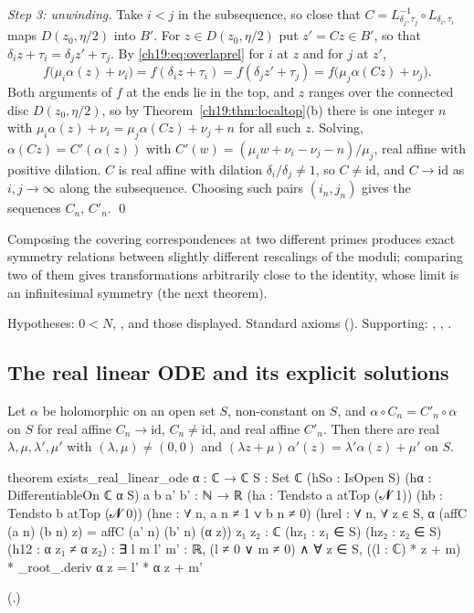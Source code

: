 \emph{Step 3: unwinding.}  Take $i<j$ in the subsequence, so close that $C=L_{\delta_j,\tau_j}^{-1}\circ L_{\delta_i,\tau_i}$ maps
$D(z_0,\eta/2)$ into $B'$.  For $z\in D(z_0,\eta/2)$ put $z'=Cz\in B'$, so that $\delta_iz+\tau_i=\delta_jz'+\tau_j$.  By
\eqref{ch19:eq:overlaprel} for $i$ at $z$ and for $j$ at $z'$,
\begin{equation*}
  f\bigl(\mu_i\alpha(z)+\nu_i\bigr)=f(\delta_iz+\tau_i)=f(\delta_jz'+\tau_j)=f\bigl(\mu_j\alpha(Cz)+\nu_j\bigr).
\end{equation*}
Both arguments of $f$ at the ends lie in the top, and $z$ ranges over the connected disc $D(z_0,\eta/2)$, so by
Theorem~\ref{ch19:thm:localtop}(b) there is one integer $n$ with $\mu_i\alpha(z)+\nu_i=\mu_j\alpha(Cz)+\nu_j+n$ for all such $z$.  Solving,
$\alpha(Cz)=C'(\alpha(z))$ with $C'(w)=(\mu_iw+\nu_i-\nu_j-n)/\mu_j$, real affine with positive dilation.  $C$ is real affine with dilation
$\delta_i/\delta_j\ne1$, so $C\ne\mathrm{id}$, and $C\to\mathrm{id}$ as $i,j\to\infty$ along the subsequence.  Choosing such pairs $(i_n,j_n)$
gives the sequences $C_n$, $C'_n$. \qed
\begin{physics}Composing the covering correspondences at two different primes produces exact symmetry relations between
slightly different rescalings of the moduli; comparing two of them gives transformations arbitrarily close to the identity, whose
limit is an infinitesimal symmetry (the next theorem).\end{physics}
\begin{status}Hypotheses: $0<N$, , and those displayed.  Standard axioms
().  Supporting: , ,
.\end{status}

\subsection{The real linear ODE and its explicit solutions}

\begin{theorem}\label{ch19:thm:ode-alpha}
Let $\alpha$ be holomorphic on an open set $S$, non-constant on $S$, and $\alpha\circ C_n=C'_n\circ\alpha$ on $S$ for real affine $C_n\to\mathrm{id}$,
$C_n\ne\mathrm{id}$, and real affine $C'_n$.  Then there are real $\lambda,\mu,\lambda',\mu'$ with $(\lambda,\mu)\ne(0,0)$ and
$(\lambda z+\mu)\,\alpha'(z)=\lambda'\alpha(z)+\mu'$ on $S$.
\end{theorem}
\begin{leancode}
theorem exists_real_linear_ode {α : ℂ → ℂ} {S : Set ℂ} (hSo : IsOpen S)
    (hα : DifferentiableOn ℂ α S) {a b a' b' : ℕ → ℝ} (ha : Tendsto a atTop (𝓝 1))
    (hb : Tendsto b atTop (𝓝 0)) (hne : ∀ n, a n ≠ 1 ∨ b n ≠ 0)
    (hrel : ∀ n, ∀ z ∈ S, α (affC (a n) (b n) z) = affC (a' n) (b' n) (α z))
    {z₁ z₂ : ℂ} (hz₁ : z₁ ∈ S) (hz₂ : z₂ ∈ S) (h12 : α z₁ ≠ α z₂) :
    ∃ l m l' m' : ℝ, (l ≠ 0 ∨ m ≠ 0) ∧
      ∀ z ∈ S, ((l : ℂ) * z + m) * _root_.deriv α z = l' * α z + m'
\end{leancode}
(.)
